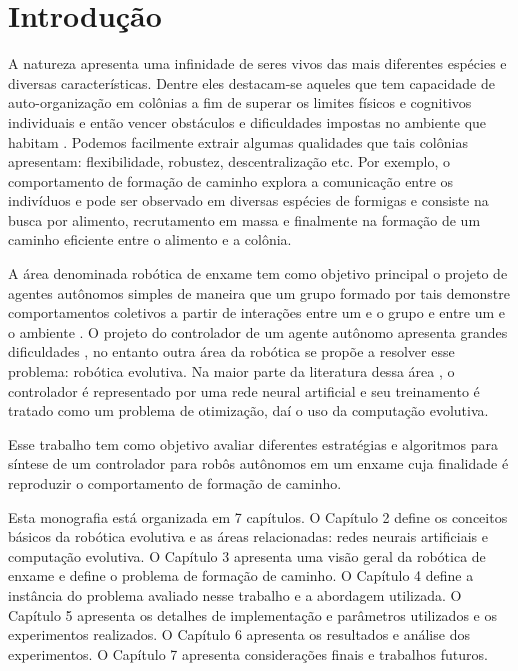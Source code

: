 \chapter{Introdução}
\label{cha:introducao}

A natureza apresenta uma infinidade de seres vivos das mais diferentes espécies e diversas características. Dentre eles destacam-se aqueles que tem capacidade de auto-organização em colônias a fim de superar os limites físicos e cognitivos individuais e então vencer obstáculos e dificuldades impostas no ambiente que habitam \cite{navarro2012introduction}. Podemos facilmente extrair algumas qualidades que tais colônias apresentam: flexibilidade, robustez, descentralização etc. Por exemplo, o comportamento de formação de caminho explora a comunicação entre os indivíduos e pode ser observado em diversas espécies de formigas e consiste na busca por alimento, recrutamento em massa e finalmente na formação de um caminho eficiente entre o alimento e a colônia.

A área denominada robótica de enxame tem como objetivo principal o projeto de agentes autônomos simples de maneira que um grupo formado por tais demonstre comportamentos coletivos a partir de interações entre um e o grupo e entre um e o ambiente \cite{sahin2005swarm}. O projeto do controlador de um agente autônomo apresenta grandes dificuldades \cite{nolfi1994howtoevolve}, no entanto outra área da robótica se propõe a resolver esse problema: robótica evolutiva. Na maior parte da literatura dessa área \cite{nelson2009fitness}, o controlador é representado por uma rede neural artificial e seu treinamento é tratado como um problema de otimização, daí o uso da computação evolutiva.

Esse trabalho tem como objetivo avaliar diferentes estratégias e algoritmos para síntese de um controlador para robôs autônomos em um enxame cuja finalidade é reproduzir o comportamento de formação de caminho.

Esta monografia está organizada em 7 capítulos. O Capítulo 2 define os conceitos básicos da robótica evolutiva e as áreas relacionadas: redes neurais artificiais e computação evolutiva. O Capítulo 3 apresenta uma visão geral da robótica de enxame e define o problema de formação de caminho. O Capítulo 4 define a instância do problema avaliado nesse trabalho e a abordagem utilizada. O Capítulo 5 apresenta os detalhes de implementação e parâmetros utilizados e os experimentos realizados. O Capítulo 6 apresenta os resultados e análise dos experimentos. O Capítulo 7 apresenta considerações finais e trabalhos futuros.